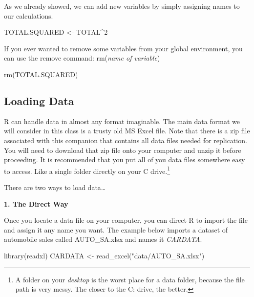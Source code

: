 \documentclass[
]{book}
\newenvironment{Shaded}{\begin{snugshade}}{\end{snugshade}}
\newcommand{\DecValTok}[1]{\textcolor[rgb]{0.00,0.00,0.81}{#1}}
\newcommand{\FunctionTok}[1]{\textcolor[rgb]{0.00,0.00,0.00}{#1}}
\newcommand{\NormalTok}[1]{#1}
\newcommand{\OtherTok}[1]{\textcolor[rgb]{0.56,0.35,0.01}{#1}}
\newcommand{\SpecialCharTok}[1]{\textcolor[rgb]{0.00,0.00,0.00}{#1}}
\newcommand{\StringTok}[1]{\textcolor[rgb]{0.31,0.60,0.02}{#1}}
\begin{document}
As we already showed, we can add new variables by simply assigning names to our calculations.

\begin{Shaded}
\begin{Highlighting}[]
\NormalTok{TOTAL.SQUARED }\OtherTok{\textless{}{-}}\NormalTok{ TOTAL}\SpecialCharTok{\^{}}\DecValTok{2}
\end{Highlighting}
\end{Shaded}

If you ever wanted to remove some variables from your global environment, you can use the remove command: rm(\emph{name of variable})

\begin{Shaded}
\begin{Highlighting}[]
\FunctionTok{rm}\NormalTok{(TOTAL.SQUARED)}
\end{Highlighting}
\end{Shaded}

\hypertarget{loading-data}{%
\subsection{Loading Data}\label{loading-data}}

R can handle data in almost any format imaginable. The main data format we will consider in this class is a trusty old MS Excel file. Note that there is a zip file associated with this companion that contains all data files needed for replication. You will need to download that zip file onto your computer and unzip it before proceeding. It is recommended that you put all of you data files somewhere easy to access. Like a single folder directly on your C drive.\footnote{A folder on your \emph{desktop} is the worst place for a data folder, because the file path is very messy. The closer to the C: drive, the better.}

There are two ways to load data\ldots{}

\textbf{1. The Direct Way}

Once you locate a data file on your computer, you can direct R to import the file and assign it any name you want. The example below imports a dataset of automobile sales called AUTO\_SA.xlsx and names it \emph{CARDATA}.

\begin{Shaded}
\begin{Highlighting}[]
\FunctionTok{library}\NormalTok{(readxl)}
\NormalTok{CARDATA }\OtherTok{\textless{}{-}} \FunctionTok{read\_excel}\NormalTok{(}\StringTok{"data/AUTO\_SA.xlsx"}\NormalTok{)}
\end{Highlighting}
\end{Shaded}
\end{document}
